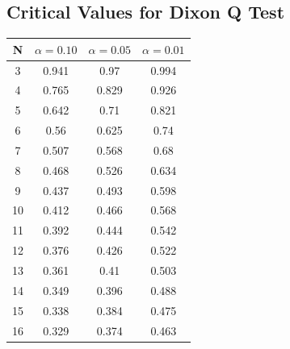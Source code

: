 \documentclass[a4paper,12pt]{article}
\begin{document}
\subsection*{Critical Values for Dixon Q Test}
{
	\Large
	\begin{center}
		\begin{tabular}{|c|c|c|c|}
			\hline  N  & $\alpha=0.10$  & $\alpha=0.05$  & $\alpha=0.01$  \\ \hline
			3  & 0.941 & 0.97  & 0.994 \\ \hline
			4  & 0.765 & 0.829 & 0.926 \\ \hline
			5  & 0.642 & 0.71  & 0.821 \\ \hline
			6  & 0.56  & 0.625 & 0.74  \\ \hline
			7  & 0.507 & 0.568 & 0.68  \\ \hline
			8  & 0.468 & 0.526 & 0.634 \\ \hline
			9  & 0.437 & 0.493 & 0.598 \\ \hline
			10 & 0.412 & 0.466 & 0.568 \\ \hline
			11 & 0.392 & 0.444 & 0.542 \\ \hline
			12 & 0.376 & 0.426 & 0.522 \\ \hline
			13 & 0.361 & 0.41  & 0.503 \\ \hline
			14 & 0.349 & 0.396 & 0.488 \\ \hline
			15 & 0.338 & 0.384 & 0.475 \\ \hline
			16 & 0.329 & 0.374 & 0.463 \\ \hline
		\end{tabular} 
	\end{center}
}
\end{document}
